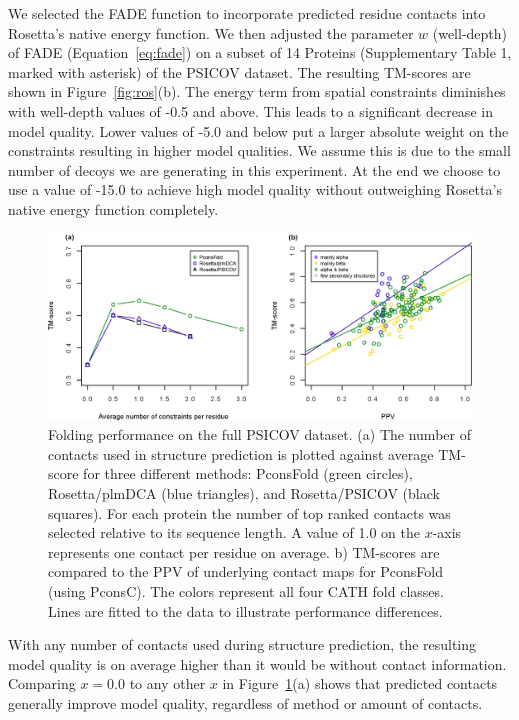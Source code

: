 \documentclass{bioinfo}
\begin{document}
We selected the FADE function to incorporate predicted residue
contacts into Rosetta's native energy function. We then adjusted the
parameter $w$ (well-depth) of FADE (Equation~\ref{eq:fade}) on a
subset of 14 Proteins (Supplementary Table 1, marked with asterisk) of the PSICOV
dataset. The resulting TM-scores are shown in Figure~\ref{fig:ros}(b). The energy term from spatial constraints diminishes with
well-depth values of -0.5 and above. This leads to a significant
decrease in model quality. Lower values of -5.0 and below put a larger
absolute weight on the constraints resulting in higher model
qualities. We assume this is due to the small number of decoys we are
generating in this experiment. At the end we choose to use a value of -15.0 to achieve
high model quality without outweighing Rosetta's native energy
function completely.


\begin{figure}[!tpb]%
\centerline{\includegraphics[scale=0.7]{figures/tmscores.eps}}
\caption{Folding performance on the full PSICOV dataset. (a) The 
 number of contacts used in structure prediction is
 plotted against average TM-score for three different methods:
 PconsFold (green circles), Rosetta/plmDCA (blue triangles), and
 Rosetta/PSICOV (black squares). For each protein the number of top
 ranked contacts was selected relative to its sequence length. A value
 of 1.0 on the $x$-axis represents one
 contact per residue on average. b) TM-scores are compared
 to the PPV of underlying contact maps for PconsFold (using
 PconsC). The colors represent all four CATH fold classes. Lines 
 are fitted to the data to illustrate performance differences.}\label{fig:main}
\end{figure}

With any number of contacts used during structure prediction, the
resulting model quality is on average higher than it would be without
contact information. Comparing $x=0.0$ to any
other $x$ in Figure~\ref{fig:main}(a) shows that predicted contacts generally improve model
quality, regardless of method or amount of contacts. 
\end{document}
